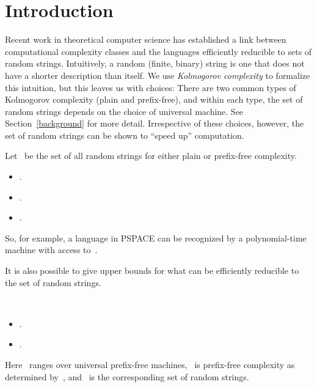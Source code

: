 \documentclass{LMCS}
\newcommand{\0}{\mathbf{0}}
\newcommand{\<}{\langle}
\renewcommand{\>}{\rangle}
\begin{document}
\maketitle\vfill



\section{Introduction}
\label{sec_intro}

Recent work in theoretical computer science has established a link between
computational complexity classes and the languages efficiently reducible to
sets of random strings. Intuitively, a random (finite, binary) string is one
that does not have a shorter description than itself. We use \emph{Kolmogorov
complexity} to formalize this intuition, but this leaves us with choices:
There are two common types of Kolmogorov complexity (plain and prefix-free),
and within each type, the set of random strings depends on the choice of
universal machine. See Section~\ref{background} for more detail. Irrespective
of these choices, however, the set of random strings can be shown to ``speed
up'' computation.

\begin{thm}\label{thm:low} Let~ be the set of all
random strings for either plain or prefix-free complexity.
\begin{itemize}
	\item .
	\item .
	\item .
\end{itemize}
\end{thm}

\noindent So, for example, a language in PSPACE can be recognized by a
polynomial-time machine with access to~.

It is also possible to give upper bounds for what can be efficiently
reducible to the set of random strings.

\begin{thm}\label{thm:AFG}\
\begin{itemize}
\item .
\item .
\end{itemize}
Here~ ranges over universal prefix-free machines,~ is prefix-free
complexity as determined by~, and~ is the corresponding set of
random strings.
\end{thm}
\end{document}

